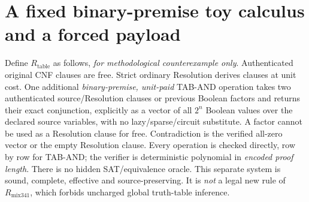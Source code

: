\documentclass[11pt]{article}
\begin{document}
\section*{A fixed binary-premise toy calculus and a forced payload}
Define $R_{\mathrm{table}}$ as follows, \emph{for methodological
counterexample only}. Authenticated original CNF clauses are free.
Strict ordinary Resolution derives clauses at unit cost.
One additional \emph{binary-premise, unit-paid} TAB-AND operation
takes two authenticated source/Resolution clauses or previous
Boolean factors and returns their exact conjunction, explicitly
as a vector of all $2^n$ Boolean values over the declared source
variables, with no lazy/sparse/circuit substitute. A factor cannot
be used as a Resolution clause for free. Contradiction is
the verified all-zero vector or the empty Resolution clause.
Every operation is checked directly, row by row for TAB-AND;
the verifier is deterministic polynomial in \emph{encoded proof
length}. There is no hidden SAT/equivalence oracle. This
separate system is sound, complete, effective and source-preserving.
It is \emph{not} a legal new rule of $R_{\mathrm{mix341}}$, which
forbids uncharged global truth-table inference.
\end{document}
